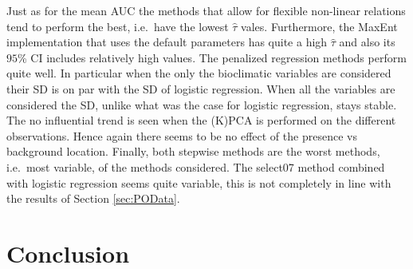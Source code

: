 Just as for the mean AUC the methods that allow for flexible non-linear relations tend 
to perform the best, i.e.\ have the lowest $\hat{\tau}$ vales. Furthermore, the MaxEnt implementation that uses the default parameters has quite a high $\hat{\tau}$ and also its $95$\% CI includes relatively high values. The penalized regression methods perform quite well. In particular when the only the bioclimatic variables are considered their SD is on par with the SD of logistic regression. When all the variables are considered the SD, unlike what was the case for logistic regression, stays stable. The no influential trend is seen when the (K)PCA is performed on the different observations. Hence again there seems to be no effect of the presence vs background location. Finally, both stepwise methods are the worst methods, i.e.\ most variable, of the methods considered. The select07 method combined with logistic regression seems quite variable, this is not completely in line with the results of Section \ref{sec:POData}.


\section{Conclusion}




